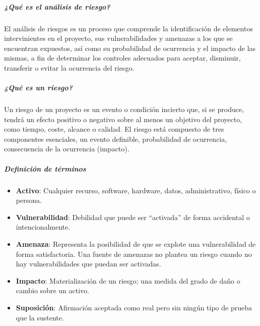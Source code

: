 \subparagraph{¿Qué es el análisis de riesgo?}

El análisis de riesgos es un proceso que comprende la identificación de elementos intervinientes en el proyecto, sus vulnerabilidades y amenazas a los que se encuentran expuestos, así como su probabilidad de ocurrencia y el impacto de las mismas, a fin de determinar los controles adecuados para aceptar, disminuir, transferir o evitar la ocurrencia del riesgo.

\subparagraph{¿Qué es un riesgo?}

Un riesgo de un proyecto es un evento o condición incierto que, si se produce, tendrá un efecto positivo o negativo sobre al menos un objetivo del proyecto, como tiempo, coste, alcance o calidad. El riesgo está compuesto de tres componentes esenciales, un evento definible, probabilidad de ocurrencia, consecuencia de la ocurrencia (impacto).

\subparagraph{Definición de términos}
	\begin{itemize}
		\item \textbf{Activo}: Cualquier recurso, software, hardware, datos, administrativo, físico o persona.
        \item \textbf{Vulnerabilidad}: Debilidad que puede ser ``activada'' de forma accidental o intencionalmente.
        \item \textbf{Amenaza}: Representa la posibilidad de que se explote una vulnerabilidad de forma satisfactoria. Una fuente de amenazas no plantea un riesgo cuando no hay vulnerabilidades que puedan ser activadas.
        \item \textbf{Impacto}: Materialización de un riesgo; una medida del grado de daño o cambio sobre un activo.
        \item \textbf{Suposición}: Afirmación aceptada como real pero sin ningún tipo de prueba que la sustente.
	\end{itemize}
    
